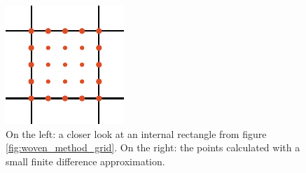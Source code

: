 \begin{figure}
    \begin{minipage}{.49\textwidth}
        \begin{center}
        \end{center}
    \end{minipage}
    \hfill
    \begin{minipage}{.49\textwidth}
        \begin{center}
            \includegraphics[width=.8\textwidth]{img/chapter4/the_method_grid_interpolate.pdf}
        \end{center}
    \end{minipage}
    \caption{On the left: a closer look at an internal rectangle from figure \ref{fig:woven_method_grid}. On the right: the points calculated with a small finite difference approximation.}\label{fig:c4_new_method_zoomed_in}
\end{figure}

